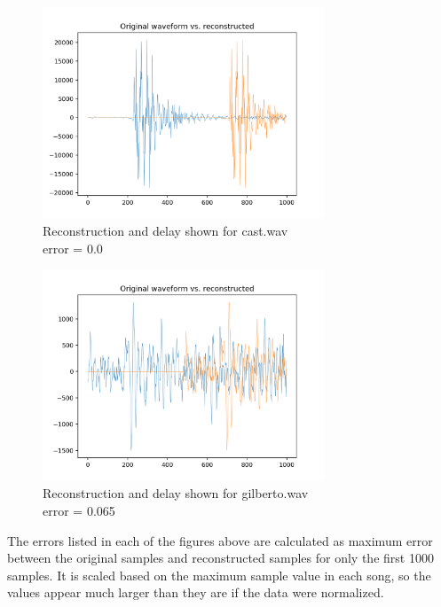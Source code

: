 \documentclass[11pt,a4paper]{article}
\begin{document}
\pagebreak

\begin{figure}[ht]
	\centering
	\includegraphics[width=0.75\textwidth]{synthesis/cast_delay}
	\caption{Reconstruction and delay shown for cast.wav \\ error = 0.0}
	\label{fig:synthesis_cast}
\end{figure}

\begin{figure}[ht]
	\centering
	\includegraphics[width=0.75\textwidth]{synthesis/gilberto_delay}
	\caption{Reconstruction and delay shown for gilberto.wav \\ error = 0.065}
	\label{fig:synthesis_gilberto}
\end{figure}

\clearpage

The errors listed in each of the figures above are calculated as maximum error between the original samples and reconstructed samples for only the first 1000 samples. It is scaled based on the maximum sample value in each song, so the values appear much larger than they are if the data were normalized.
\end{document}
